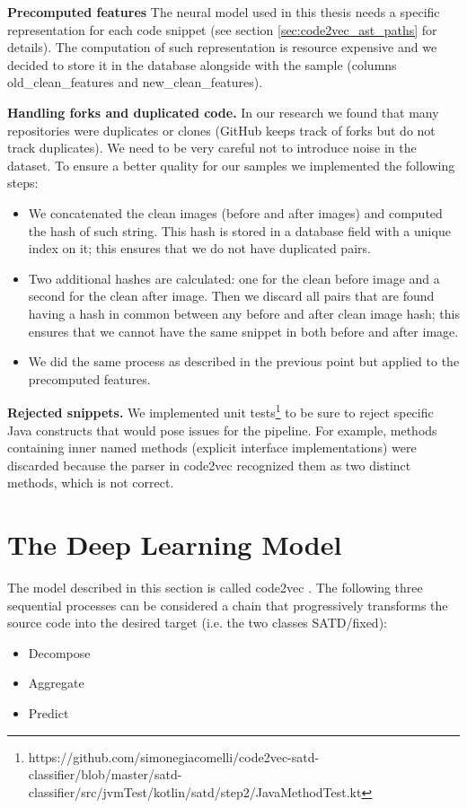 \textbf{Precomputed features}
The neural model used in this thesis needs a specific representation for each code snippet (see section \ref{sec:code2vec_ast_paths} for details). The computation of such representation is resource expensive and we decided to store it in the database alongside with the sample (columns old\_clean\_features and new\_clean\_features).


\textbf{Handling forks and duplicated code.}
In our research we found that many repositories were duplicates or clones (GitHub keeps track of forks but do not track duplicates). 
We need to be very careful not to introduce noise in the dataset. To ensure a better quality for our samples we implemented the following steps:
\begin{itemize}
    \item We concatenated the clean images (before and after images) and computed the hash of such string. This hash is stored in a database field with a unique index on it; this ensures that we do not have duplicated pairs.
    \item Two additional hashes are calculated: one for the clean before image and a second for the clean after image. Then we discard all pairs that are found having a hash in common between any before and after clean image hash; this ensures that we cannot have the same snippet in both before and after image.
    \item We did the same process as described in the previous point but applied to the precomputed features.
\end{itemize}

\textbf{Rejected snippets.} 
We implemented unit tests\footnote{https://github.com/simonegiacomelli/code2vec-satd-classifier/blob/master/satd-classifier/src/jvmTest/kotlin/satd/step2/JavaMethodTest.kt} to be sure to reject specific Java constructs that would pose issues for the pipeline. For example, methods containing inner named methods (explicit interface implementations) were discarded because the parser in code2vec recognized them as two distinct methods, which is not correct. 


\section{The Deep Learning Model}
The model described in this section is called code2vec \cite{alon2019code2vec}.
The following three sequential processes can be considered a chain that progressively transforms the source code into the desired target (i.e. the two classes SATD/fixed):
\begin{itemize}
    \item Decompose
    \item Aggregate
    \item Predict
\end{itemize}

